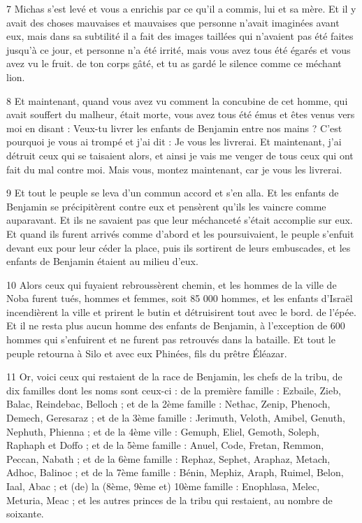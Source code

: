 \par 7 Michas s'est levé et vous a enrichis par ce qu'il a commis, lui et sa mère. Et il y avait des choses mauvaises et mauvaises que personne n'avait imaginées avant eux, mais dans sa subtilité il a fait des images taillées qui n'avaient pas été faites jusqu'à ce jour, et personne n'a été irrité, mais vous avez tous été égarés et vous avez vu le fruit. de ton corps gâté, et tu as gardé le silence comme ce méchant lion.

\par 8 Et maintenant, quand vous avez vu comment la concubine de cet homme, qui avait souffert du malheur, était morte, vous avez tous été émus et êtes venus vers moi en disant : Veux-tu livrer les enfants de Benjamin entre nos mains ? C'est pourquoi je vous ai trompé et j'ai dit : Je vous les livrerai. Et maintenant, j'ai détruit ceux qui se taisaient alors, et ainsi je vais me venger de tous ceux qui ont fait du mal contre moi. Mais vous, montez maintenant, car je vous les livrerai.

\par 9 Et tout le peuple se leva d'un commun accord et s'en alla. Et les enfants de Benjamin se précipitèrent contre eux et pensèrent qu'ils les vaincre comme auparavant. Et ils ne savaient pas que leur méchanceté s'était accomplie sur eux. Et quand ils furent arrivés comme d'abord et les poursuivaient, le peuple s'enfuit devant eux pour leur céder la place, puis ils sortirent de leurs embuscades, et les enfants de Benjamin étaient au milieu d'eux.

\par 10 Alors ceux qui fuyaient rebroussèrent chemin, et les hommes de la ville de Noba furent tués, hommes et femmes, soit 85 000 hommes, et les enfants d'Israël incendièrent la ville et prirent le butin et détruisirent tout avec le bord. de l'épée. Et il ne resta plus aucun homme des enfants de Benjamin, à l'exception de 600 hommes qui s'enfuirent et ne furent pas retrouvés dans la bataille. Et tout le peuple retourna à Silo et avec eux Phinées, fils du prêtre Éléazar.

\par 11 Or, voici ceux qui restaient de la race de Benjamin, les chefs de la tribu, de dix familles dont les noms sont ceux-ci : de la première famille : Ezbaile, Zieb, Balac, Reindebac, Belloch ; et de la 2ème famille : Nethac, Zenip, Phenoch, Demech, Geresaraz ; et de la 3ème famille : Jerimuth, Veloth, Amibel, Genuth, Nephuth, Phienna ; et de la 4ème ville : Gemuph, Eliel, Gemoth, Soleph, Raphaph et Doffo ; et de la 5ème famille : Anuel, Code, Fretan, Remmon, Peccan, Nabath ; et de la 6ème famille : Rephaz, Sephet, Araphaz, Metach, Adhoc, Balinoc ; et de la 7ème famille : Bénin, Mephiz, Araph, Ruimel, Belon, Iaal, Abac ; et (de) la (8ème, 9ème et) 10ème famille : Enophlasa, Melec, Meturia, Meac ; et les autres princes de la tribu qui restaient, au nombre de soixante.

